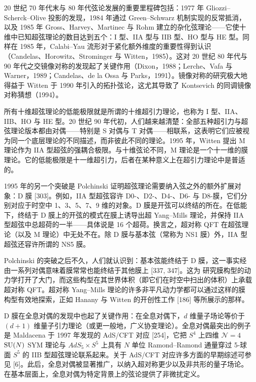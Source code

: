 20 世纪 70 年代末与 80 年代弦论发展的重要里程碑包括：1977 年 Gliozzi--Scherck--Olive 投影的发现，1984 年通过 Green--Schwarz 机制实现的反常抵消，以及 1985 年 Gross、Harvey、Martinec 与 Rohm 建立的杂化弦理论——它使十维中已知超弦理论的数目达到五个：I 型、IIA 型与 IIB 型、HO 型与 HE 型。同样在 1985 年，Calabi--Yau 流形对于紧化额外维度的重要性得到认识（Candelas、Horowitz、Strominger 与 Witten，1985）。这对 20 世纪 80 年代与 90 年代之交镜像对称的发现起了关键作用（Dixon，1988；Lerche、Vafa 与 Warner，1989；Candelas、de la Ossa 与 Parks，1991）。镜像对称的研究极大地得益于 Witten 于 1990 年引入的拓扑弦论，这尤其导致了 Kontsevich 的同调镜像对称猜想（1994）。

所有十维超弦理论的低能极限就是所谓的十维超引力理论，也称为 I 型、IIA、IIB、HO 与 HE 型。20 世纪 90 年代初，人们越来越清楚：全部五种超引力与超弦理论版本都由对偶——特别是 S 对偶与 T 对偶——相联系，这表明它们应被视为同一个底层理论的不同描述，而非彼此不同的理论。1995 年，Witten 提出 M 理论作为 IIA 型超弦的强耦合极限。与十维弦论不同，M 理论是一个十一维的膜理论。它的低能极限是十一维超引力，后者在某种意义上在超引力理论中是普适的。

1995 年的另一个突破是 Polchinski 证明超弦理论需要纳入弦之外的额外扩展对象：D 膜 [303]。例如，IIA 型超弦容许 D0-、D2-、D4-、D6- 与 D8-膜，它们分别对应于时空中 1、3、5、7、9 维的对象。D 膜是开弦可以终结的所在。在低能下，终结于 D 膜上的开弦的模式在膜上诱导出超 Yang--Mills 理论，并保持 IIA 型超弦中总超荷的一半——具体说是 16 个超荷。换言之，超对称 QFT 在超弦理论（以及 M 理论）中无处不在。除 D 膜与基本弦（常称为 NS1 膜）外，IIA 型超弦还容许所谓的 NS5 膜。

Polchinski 的突破之后不久，人们就认识到：基本弦能终结于 D 膜，这一事实经由一系列对偶意味着膜常常也能终结于其他膜上 [337, 347]。这为
研究膜构型的动力学打开了大门，而这些构型在其世界体积（即它们在时空中扫出的体积）上承载超对称 QFT。超对称 Yang--Mills 理论的许多非平凡动力学都可以通过这样的膜构型有效地探索，正如 Hanany 与 Witten 的开创性工作 [186] 等所展示的那样。

D 膜在全息对偶的发现中也起了关键作用：在全息对偶下，$d$ 维量子场论等价于 $(d+1)$ 维量子引力理论（或更一般地，广义协变理论）。全息对偶最突出的例子是 Maldacena 于 1997 年发现的 AdS/CFT 对应 [254]，它把 $S^4$ 上四维 $\mathcal{N}=4$ $\operatorname{SU}(N)$ SYM 理论与 $AdS_5\times S^5$ 上具有 $N$ 单位 Ramond--Ramond 通量穿过 5-球面 $S^5$ 的 IIB 型超弦理论联系起来。关于 AdS/CFT 对应许多方面的早期综述可参见 [6]。此后，全息对偶被显著推广，以纳入超对称更少以及非共形的量子场论。在基本层面上，全息对偶为特定背景上的弦论提供了非微扰定义。

